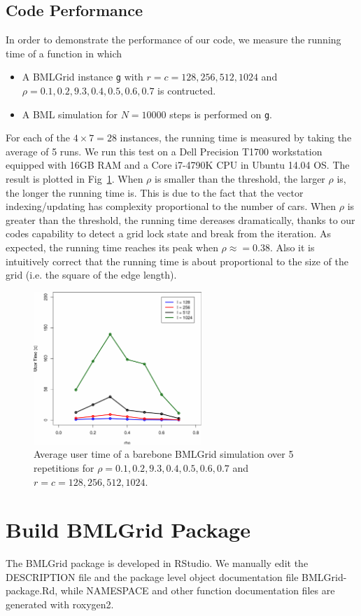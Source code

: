 \documentclass[twocolumn]{article}
\begin{document}
\subsection{Code Performance}
In order to demonstrate the performance of our code, we measure the running time
of a function in which
\begin{itemize}
    \item A BMLGrid instance \texttt{g} with $r=c=128,256,512,1024$ and
    $\rho=0.1,0.2,9.3,0.4,0.5,0.6,0.7$ is contructed.
    \item A BML simulation for $N=10000$ steps is performed on \texttt{g}.
\end{itemize}
For each of the $4\times7 = 28$ instances, the running time is measured by
taking the average of 5 runs. We run this test on a Dell Precision T1700
workstation equipped with 16GB RAM and a Core i7-4790K CPU in Ubuntu 14.04 OS.
The result is plotted in Fig~\ref{fig:running_time}. When $\rho$ is smaller than
the threshold, the larger $\rho$ is, the longer the running time is. This is due
to the fact that the vector indexing/updating has complexity proportional to the
number of cars. When $\rho$ is greater than the threshold, the running time
dereases dramatically, thanks to our codes capability to detect a grid lock
state and break from the iteration. As expected, the running time reaches its
peak when $\rho\approx=0.38$. Also it is intuitively correct that the running
time is about proportional to the size of the grid (i.e. the square of the edge
length).


\begin{figure}[h]
    \centering
    \includegraphics[width=2.5in]{figs/TestRunningTime.pdf}
    \caption{Average user time of a barebone BMLGrid simulation over 5
    repetitions for $\rho=0.1,0.2,9.3,0.4,0.5,0.6,0.7$ and
    $r=c=128,256,512,1024$.}
    \label{fig:running_time}
\end{figure}

\section{Build BMLGrid Package}
The BMLGrid package is developed in RStudio. We manually edit the
DESCRIPTION file and the package level object documentation file
BMLGrid-package.Rd, while NAMESPACE and other function
documentation files are generated with roxygen2. 


%
%

\end{document}
